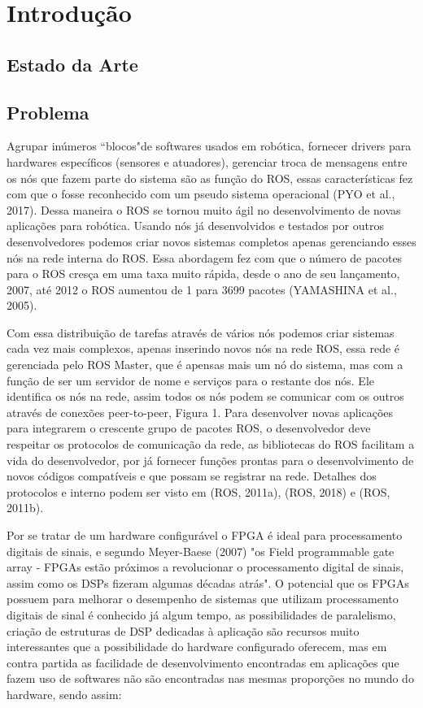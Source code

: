 \chapter{Introdução}

\section{Estado da Arte}

\section{Problema}

Agrupar inúmeros “blocos"de softwares usados em robótica, fornecer drivers para
hardwares específicos (sensores e atuadores), gerenciar troca de mensagens entre os nós
que fazem parte do sistema são as função do ROS, essas características fez com que o
fosse reconhecido com um pseudo sistema operacional (PYO et al., 2017). Dessa maneira o
ROS se tornou muito ágil no desenvolvimento de novas aplicações para robótica. Usando
nós já desenvolvidos e testados por outros desenvolvedores podemos criar novos sistemas
completos apenas gerenciando esses nós na rede interna do ROS. Essa abordagem fez com
que o número de pacotes para o ROS cresça em uma taxa muito rápida, desde o ano de
seu lançamento, 2007, até 2012 o ROS aumentou de 1 para 3699 pacotes (YAMASHINA
et al., 2005).

Com essa distribuição de tarefas através de vários nós podemos criar sistemas cada
vez mais complexos, apenas inserindo novos nós na rede ROS, essa rede é gerenciada
pelo ROS Master, que é apensas mais um nó do sistema, mas com a função de ser um
servidor de nome e serviços para o restante dos nós. Ele identifica os nós na rede, assim
todos os nós podem se comunicar com os outros através de conexões peer-to-peer, Figura
1. Para desenvolver novas aplicações para integrarem o crescente grupo de pacotes ROS, o
desenvolvedor deve respeitar os protocolos de comunicação da rede, as bibliotecas do ROS
facilitam a vida do desenvolvedor, por já fornecer funções prontas para o desenvolvimento
de novos códigos compatíveis e que possam se registrar na rede. Detalhes dos protocolos e
interno podem ser visto em (ROS, 2011a), (ROS, 2018) e (ROS, 2011b).

Por se tratar de um hardware configurável o FPGA é ideal para processamento
digitais de sinais, e segundo Meyer-Baese (2007) "os Field programmable gate array -
FPGAs estão próximos a revolucionar o processamento digital de sinais, assim como os
DSPs fizeram algumas décadas atrás". O potencial que os FPGAs possuem para melhorar o 
desempenho de sistemas que utilizam processamento digitais de sinal é conhecido já algum
tempo, as possibilidades de paralelismo, criação de estruturas de DSP dedicadas à aplicação
são recursos muito interessantes que a possibilidade do hardware configurado oferecem,
mas em contra partida as facilidade de desenvolvimento encontradas em aplicações que
fazem uso de softwares não são encontradas nas mesmas proporções no mundo do hardware,
sendo assim:

